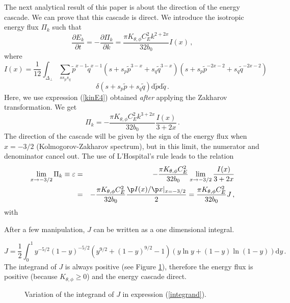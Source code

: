 \documentclass{jpp}
\newcommand{\red}[1]{}
\def\be{\begin{equation}}
\def\ee{\end{equation}}
\def\ba{\begin{eqnarray}}
\def\ea{\end{eqnarray}}
\def\dd{\mathrm{d}}
\begin{document}
The next analytical result of this paper is about the direction of the energy cascade. We can prove that this cascade is direct. 
We introduce the isotropic energy flux $\Pi_{k}$ such that 
\be
\frac{\partial E_k}{\partial t} = - \frac{\partial \Pi_k} {\partial k} = \frac{\pi K_{\theta,\phi} C_E^2 k^{2+2x}}{32b_0} I(x)\, , 
\ee
where
\be
I(x) = \frac{1}{12} \int_{\Delta_\perp} \sum_{ss_{p} s_{q}} {\tilde p}^{x-1} {\tilde q}^{x-1} 
\left(s+s_p {\tilde p}^{3-x} +s_q {\tilde q}^{3-x} \right) \left(s+s_p {\tilde p}^{-2x-2} +s_q {\tilde q}^{-2x-2} \right)
\ee
$$
\delta(s+s_p \tilde p+s_q \tilde q)  \dd {\tilde p} \dd {\tilde q} \, .
$$
Here, we use expression (\ref{kinE4}) obtained {\it after} applying the Zakharov transformation. We get
\be
\Pi_k = - \frac{\pi K_{\theta,\phi} C_E^2 k^{3+2x}}{32b_0} \frac{I(x)}{3+2x} \, . 
\ee
The direction of the cascade will be given by the sign of the energy flux when $x=-3/2$ (Kolmogorov-Zakharov spectrum), but in this limit, the numerator and denominator cancel out. The use of L'Hospital's rule leads to the relation
\ba
\lim_{x \to -3/2} \Pi_k \equiv \varepsilon &=& - \frac{\pi K_{\theta,\phi} C_E^2}{32b_0} \lim_{x \to -3/2} \frac{I(x)}{3+2x} \\
&=& - \frac{\pi K_{\theta,\phi} C_E^2}{32b_0} \frac{\p I(x)/\p x\vert_{x=-3/2}}{2}
= \frac{\pi K_{\theta,\phi} C_E^2}{32b_0} J \, ,
\ea
with 
\red{
\be
J = \frac{1}{12} \sum_{ss_{p} s_{q}} J^{ss_ps_q} 
\ee
and
\be
J^{ss_ps_q} = \int_{\Delta_\perp} {\tilde p}^{-5/2} {\tilde q}^{-5/2} 
\left(s+s_p {\tilde p}^{9/2} +s_q {\tilde q}^{9/2} \right) \left(s_p {\tilde p} \ln {\tilde p}  +s_q {\tilde q} \ln {\tilde q} \right)
\ee
$$
\delta(s+s_p \tilde p+s_q \tilde q) \dd {\tilde p} \dd {\tilde q} \, .
$$}
After a few manipulation, $J$ can be written as a one dimensional integral. 
\red{To find this integral, we first use the following change of variables: ${\tilde q} = {\tilde p} +1$ for $J^{++-}$, ${\tilde q} = {\tilde p} -1$ for $J^{+-+}$ and ${\tilde q} = 1-{\tilde p}$ for $J^{+--}$, which leads to
\be
J^{++-} = \int_0^{+\infty} x^{-5/2} (1+x)^{-5/2} \left(1+x^{9/2} - (1+x)^{9/2} \right) \left(x \ln x - (1+x) \ln (1+x) \right) \dd x \, ,
\ee
\be
J^{+-+} = J^{++-}
\ee
and
\be
J^{+--} = - \int_0^{1} x^{-5/2} (1-x)^{-5/2} \left(1-x^{9/2} - (1-x)^{9/2} \right) \left(x \ln x + (1-x) \ln (1-x) \right) \dd x \, .
\ee
Then, we introduce the change of variable $y = 1/(x+1)$ for $J^{++-}$ which becomes equal to $J^{+--}$. This leads  after summation to}
\be \label{integrand}
J = \frac{1}{2} \int_0^1 y^{-5/2} (1-y)^{-5/2} \left(y^{9/2} + (1-y)^{9/2} -1 \right) \left(y \ln y + (1-y) \ln (1-y) \right) \dd y \, .
\ee
The integrand of $J$ is always positive (see Figure \ref{fig2}), therefore the energy flux is positive (because $K_{\theta,\phi} \ge 0$) and the energy cascade direct. 
\begin{figure}
\caption{Variation of the integrand of $J$ in expression (\ref{integrand}).}
\label{fig2}
\end{figure}
\end{document}
